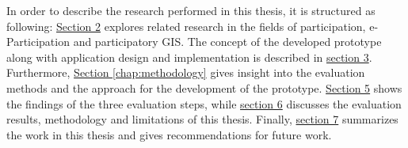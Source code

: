 In order to describe the research performed in this thesis, it is structured as following: \hyperref[chap:related_work]{Section 2} explores related research in the fields of participation, e-Participation and participatory GIS. The concept of the developed prototype along with application design and implementation is described in \hyperref[chap:approach]{section 3}. Furthermore, \hyperref[chap:methodology]{Section \ref{chap:methodology}} gives insight into the evaluation methods and the approach for the development of the prototype. \hyperref[chap:methodology]{Section 5} shows the findings of the three evaluation steps, while \hyperref[chap:discussion]{section 6} discusses the evaluation results, methodology and limitations of this thesis. Finally, \hyperref[chap:conclusion]{section 7} summarizes the work in this thesis and gives recommendations for future work.
